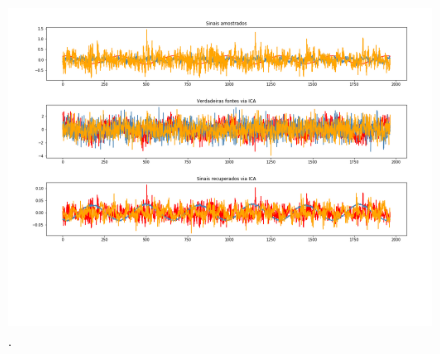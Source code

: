 \begin{figure}[H]
    \caption{.}
    \begin{center}
        \includegraphics[scale=.4]{resultados/img/ica}
    \end{center}
    \label{fig:satelite_completo}
\end{figure}